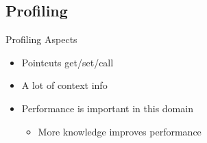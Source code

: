 \subsection*{Profiling}

\begin{frame}{Profiling Aspects}



  \begin{itemize}
\item Pointcuts get/set/call %
\item A lot of context info  %
\item Performance is important in this domain
\begin{itemize}
\item More knowledge improves performance
\end{itemize}
\end{itemize}
\end{frame}
